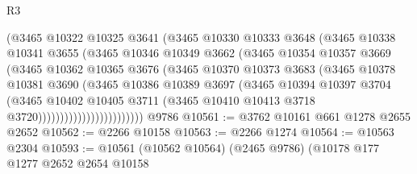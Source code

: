 \begin{lexlean}{R3}
\begin{coremodule}
                            (@3465
                              @10322
                              @10325
                              @3641
                              (@3465
                                @10330
                                @10333
                                @3648
                                (@3465
                                  @10338
                                  @10341
                                  @3655
                                  (@3465
                                    @10346
                                    @10349
                                    @3662
                                    (@3465
                                      @10354
                                      @10357
                                      @3669
                                      (@3465
                                        @10362
                                        @10365
                                        @3676
                                        (@3465
                                          @10370
                                          @10373
                                          @3683
                                          (@3465
                                            @10378
                                            @10381
                                            @3690
                                            (@3465
                                              @10386
                                              @10389
                                              @3697
                                              (@3465
                                                @10394
                                                @10397
                                                @3704
                                                (@3465
                                                  @10402
                                                  @10405
                                                  @3711
                                                  (@3465
                                                    @10410
                                                    @10413
                                                    @3718
                                                    @3720))))))))))))))))))))))))
    @9786
@10561 := @3762 @10161 @661 @1278 @2655 @2652
@10562 := @2266 @10158
@10563 := @2266 @1274
@10564 := @10563 @2304
@10593 := @10561
    (@10562 @10564)
    (@2465 @9786)
    (@10178
      @177
      @1277
      @2652
      @2654
      @10158

\end{coremodule}
\end{lexlean}
